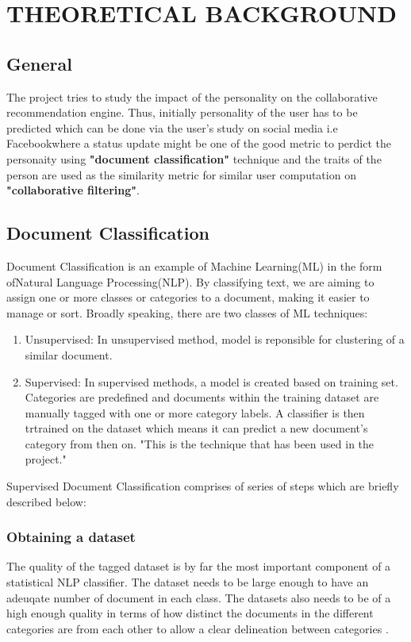 \newpage
\section{THEORETICAL BACKGROUND}
\subsection{General}
The project tries to study the impact of the personality on the collaborative recommendation engine. Thus, initially personality of the user has to be predicted which can be done via the user's study on social media i.e Facebookwhere a status update might be one of the good metric to perdict the personaity using \textbf{"document classification"} technique and the traits of the person are used as the similarity metric for similar user computation on \textbf{"collaborative filtering"}.

\subsection{Document Classification}
Document Classification is an example of Machine Learning(ML) in the form ofNatural Language Processing(NLP). By classifying text, we are aiming to assign one or more classes or categories to a document, making it easier to manage or sort. 
Broadly speaking, there are two classes of ML techniques:
\begin{enumerate}
\item Unsupervised: In unsupervised method, model is reponsible for clustering of a similar document.
\item Supervised: In supervised methods, a model is created based on training set. Categories are predefined and documents within the training dataset are manually tagged with one or more category labels. A classifier is then trtrained on the dataset which means it can predict a new document's category from then on. "This is the technique that has been used in the project."
\end{enumerate}

Supervised Document Classification comprises of series of steps which are briefly described below:
\subsubsection{Obtaining a dataset}
The quality of the tagged dataset is by far the most important component of a statistical NLP classifier. The dataset needs to be large enough to have an adeuqate number of document in each class. The datasets also needs to be of a high enough quality in terms of how distinct the documents in the different categories are from each other to allow a clear delineation between categories \cite{kd}.

